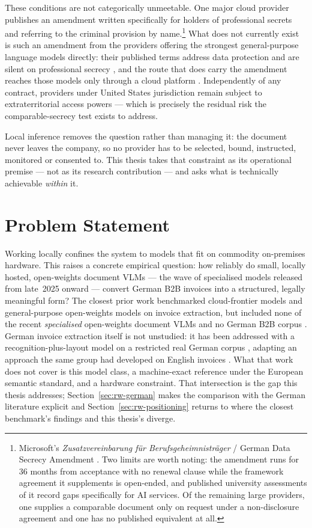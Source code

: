 These conditions are not categorically unmeetable. One major cloud provider
publishes an amendment written specifically for holders of professional secrets
and referring to the criminal provision by name.\footnote{Microsoft's
\emph{Zusatzvereinbarung f\"ur Berufsgeheimnistr\"ager} / German Data Secrecy
Amendment \parencite{msprofsecrecy}. Two limits are worth noting: the amendment
runs for 36 months from acceptance with no renewal clause while the framework
agreement it supplements is open-ended, and published university assessments of
it record gaps specifically for \ac{AI} services. Of the remaining large
providers, one supplies a comparable document only on request under a
non-disclosure agreement and one has no published equivalent at all.} What
does not currently exist is such an amendment from the providers offering the
strongest general-purpose language models directly: their published terms
address data protection and are silent on professional
secrecy \parencite{openaidpa,anthropicdpa}, and the route that does carry the
amendment reaches those models only through a cloud platform
\parencite{azureopenaieu}. Independently of any contract, providers under United
States jurisdiction remain subject to extraterritorial access powers --- which is
precisely the residual risk the comparable-secrecy test exists to address.

Local inference removes the question rather than managing it: the document never
leaves the company, so no provider has to be selected, bound, instructed, monitored
or consented to. This
thesis takes that constraint as its operational premise --- not as its research
contribution --- and asks what is technically achievable \emph{within} it.

\section{Problem Statement}
\label{sec:problem}

Working locally confines the system to models that fit on commodity
on-premises hardware. This raises a concrete empirical question: how reliably do small,
locally hosted, open-weights document \acp{VLM} --- the wave of specialised models
released from late~2025 onward --- convert German B2B invoices into a structured,
legally meaningful form? The closest prior work benchmarked cloud-frontier models
and general-purpose open-weights models on invoice extraction, but included none
of the recent \emph{specialised} open-weights document \acp{VLM} and no German
B2B corpus \parencite{berghaus2025}. German invoice extraction itself is not
unstudied: it has been addressed with a recognition-plus-layout model on a
restricted real German corpus \parencite{thiee2023invoices}, adapting an approach the
same group had developed on English invoices \parencite{krieger2021german}. What that
work does not cover is this model class, a machine-exact reference under the European
semantic standard, and a hardware constraint. That intersection is the gap this thesis
addresses; Section~\ref{sec:rw-german} makes the comparison with the German literature
explicit and Section~\ref{sec:rw-positioning} returns to where the closest benchmark's
findings and this thesis's diverge.

